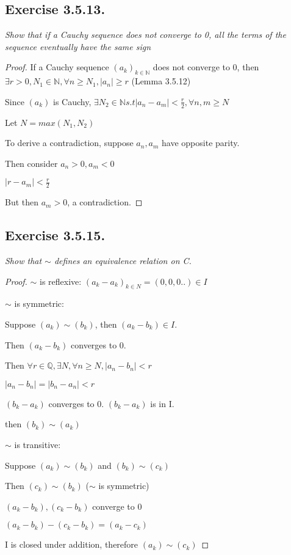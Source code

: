 \documentclass[12pt, a4paper]{article}
\begin{document}
    \subsection*{Exercise 3.5.13.}
    \textit {Show that if a Cauchy sequence does not converge to 0, all the terms of the sequence eventually have the same sign}
        \begin{proof}
            If a Cauchy sequence $(a_k)_{k \in \mathbb{N}}$ does not converge to 0, then $\exists r > 0, N_1 \in \mathbb{N}, \forall n \ge N_1, |a_n| \ge r$ (Lemma 3.5.12)

            Since $(a_k)$ is Cauchy, $\exists N_2 \in \mathbb{N} s.t |a_n-a_m| < \frac{r}{2}, \forall n,m \ge N$

            Let $ N = max(N_1, N_2)$

            To derive a contradiction, suppose $a_n, a_m$ have opposite parity. 

            Then consider $a_n >0, a_m < 0$ 
            
            $|r-a_m| < \frac{r}{2}$

            But then $a_m > 0$, a contradiction. 

        \end{proof}
    \subsection*{Exercise 3.5.15.}
    \textit{Show that $\sim$ defines an equivalence relation on C.}
        \begin{proof}
            $\sim$ is reflexive: $(a_k-a_k)_{k\in N} = (0,0,0..) \in I$

            $\sim$ is symmetric: 
            
            Suppose $(a_k)\sim (b_k)$, then $(a_k-b_k) \in I.$

            Then $(a_k-b_k)$ converges to 0. 

            Then $\forall r \in \mathbb{Q}, \exists N, \forall n \ge N, |a_n-b_n| < r$

            $|a_n-b_n| = |b_n-a_n| < r$

            $(b_k-a_k)$ converges to 0. $(b_k-a_k)$ is in I. 

            then $(b_k) \sim (a_k)$


            $\sim$ is transitive: 

            Suppose $(a_k) \sim (b_k)$ and $(b_k) \sim (c_k)$

            Then $(c_k) \sim (b_k)$ ($\sim$ is symmetric)

            $(a_k - b_k) , (c_k - b_k)$ converge to 0

            $(a_k - b_k) - (c_k - b_k) = (a_k - c_k)$

            I is closed under addition, therefore $(a_k) \sim (c_k)$

        \end{proof}
    \pagebreak
\end{document}
